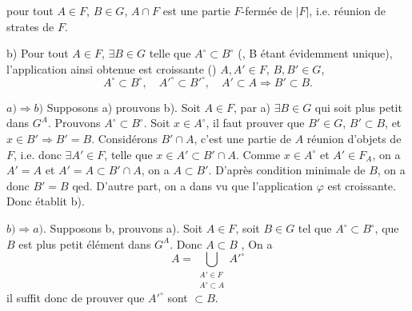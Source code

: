 \documentclass[11pt,a4paper]{article}
\begin{document}

pour tout $A \in F$, $B \in G$, $A \cap F$ est \struck{\ill{}} une partie $F$-fermée de $|F|$, i.e. réunion de strates de $F$.

b) Pour tout $A \in F$, $\exists B \in G$ telle que $A^{\circ} \subset B^{\circ}$ (, B étant évidemment unique), l'application  ainsi obtenue est croissante ()   $A, A' \in F$, $B, B' \in G$,
\[
  A^{\circ} \subset B^{\circ} , \quad A'^{\circ} \subset B'^{\circ} , \quad A' \subset A \Longrightarrow B' \subset B .
\]


$a) \Rightarrow b)$ \struck{\ill{}} Supposons a) prouvons b). Soit $A \in F$, par a) $\exists B \in G$  \struck{\ill{}} qui soit plus petit dans $G^{A}$. Prouvons \struck{\ill{}} $A^{\circ} \subset B^{\circ}$. Soit $x \in A^{\circ}$, il faut prouver que $B' \in G$, $B' \subset B$, et $x \in B' \Longrightarrow B' = B$.  Considérons $B' \cap A$, c'est une partie de $A$ réunion d'objets de $F$, i.e. \ill{} \ill{} donc $\exists A' \in F$, telle que $x \in A' \subset B' \cap A$. Comme $x \in A^{\circ}$ et $A' \in F_A$, on a $A' = A$ et  $A' = A \subset B' \cap A$, on a $A \subset B'$. D'après  condition minimale de $B$, on a donc $B' = B$ qed. D'autre part, on a \ill{} dans \ill{} \ill{} vu que l'application $\varphi$ est croissante. Donc établit b).

$b) \Rightarrow a)$. Supposons b, prouvons a). Soit $A \in F$, soit $B \in G$ tel que $A^{\circ} \subset B^{\circ}$,  que $B$ est plus petit élément dans $G^{A}$. Donc $A \subset B$ ,   On a
\[
  A = \bigcup_{\substack{A' \in F \\ A' \subset A}} A'^{\circ}
\]
\struck{\ill{}} il suffit donc de prouver que \ill{} \ill{} \ill{} $A'^{\circ}$ sont $\subset B$.

\end{document}
